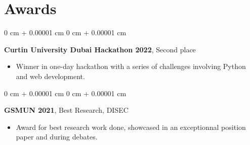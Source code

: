 \documentclass[10pt, letterpaper]{article}
\newenvironment{highlights}{
    \begin{itemize}[
        topsep=0.10 cm,
        parsep=0.10 cm,
        partopsep=0pt,
        itemsep=0pt,
        leftmargin=0 cm + 10pt
    ]
}{
    \end{itemize}
} %
\newenvironment{onecolentry}{
    \begin{adjustwidth}{
        0 cm + 0.00001 cm
    }{
        0 cm + 0.00001 cm
    }
}{
    \end{adjustwidth}
} %
\begin{document}
    \section{Awards}

        \begin{onecolentry}
            \textbf{Curtin University Dubai Hackathon 2022}, Second place
            \begin{highlights}
                \item Winner in one-day hackathon with a series of challenges involving Python and web development.
            \end{highlights}

        \end{onecolentry}

        \vspace{0.2 cm}

        \begin{onecolentry}
            \textbf{GSMUN 2021}, Best Research, DISEC
            \begin{highlights}
                \item Award for best research work done, showcased in an exceptionnal position paper and during debates.
            \end{highlights}
        \end{onecolentry}
\end{document}
